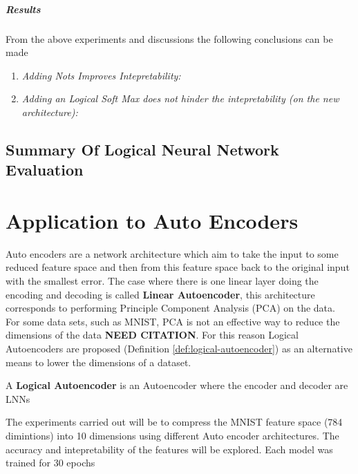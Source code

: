 \paragraph{Results}
From the above experiments and discussions the following conclusions can be made

\begin{enumerate}
	\item \textit{Adding Nots Improves Intepretability:}
	\item \textit{Adding an Logical Soft Max does not hinder the intepretability (on the new architecture):}
\end{enumerate}

\section{Summary Of Logical Neural Network Evaluation}

\chapter{Application to Auto Encoders} \label{C:lnn-application}
Auto encoders \cite{baldi2012complex} are a network architecture which aim to take the input to some reduced feature space and then from this feature space back to the original input with the smallest error. The case where there is one linear layer doing the encoding and decoding is called \textbf{Linear Autoencoder}, this architecture corresponds to performing Principle Component Analysis (PCA) on the data.\\

For some data sets, such as MNIST, PCA is not an effective way to reduce the dimensions of the data \textbf{NEED CITATION}. For this reason Logical Autoencoders are proposed (Definition \ref{def:logical-autoencoder}) as an alternative means to lower the dimensions of a dataset.

\begin{definition} \label{def:logical-autoencoder}
	A \textbf{Logical Autoencoder} is an Autoencoder where the encoder and decoder are LNNs
\end{definition}

The experiments carried out will be to compress the MNIST feature space (784 dimintions) into 10 dimensions using different Auto encoder architectures. The accuracy and intepretability of the features will be explored. Each model was trained for 30 epochs

